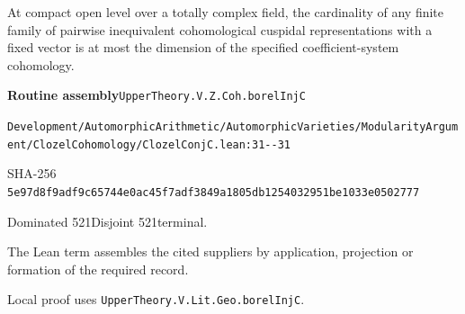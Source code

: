 
\begin{formalstatement}[D506]\label{decomp:D506}
At compact open level over a totally complex field, the cardinality of any finite family of pairwise inequivalent cohomological cuspidal representations with a fixed vector is at most the dimension of the specified coefficient-system cohomology.
\end{formalstatement}
{\small\raggedright\noindent\textsf{\bfseries Routine assembly}\quad \nolinkurl{UpperTheory.V.Z.Coh.borelInjC}\par\noindent \nolinkurl{Development/AutomorphicArithmetic/AutomorphicVarieties/ModularityArgument/ClozelCohomology/ClozelConjC.lean:31--31}\par\noindent SHA-256 \nolinkurl{5e97d8f9adf9c65744e0ac45f7adf3849a1805db1254032951be1033e0502777}\par\noindent Dominated 521\quad Disjoint 521\quad terminal.\par}
The Lean term assembles the cited suppliers by application, projection or formation of the required record.
{\small\raggedright Local proof uses \nolinkurl{UpperTheory.V.Lit.Geo.borelInjC}.\par}
